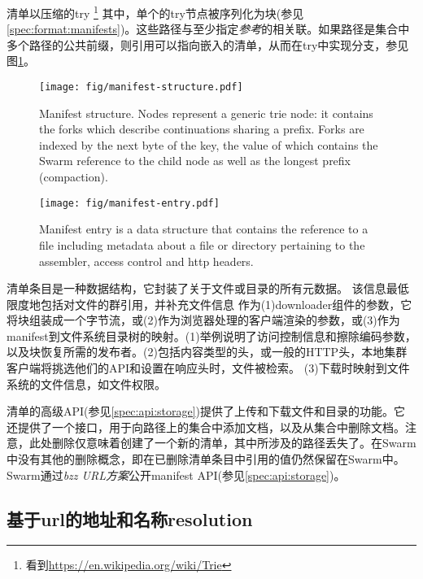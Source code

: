 清单以压缩的try %
%
\footnote{看到\url{https://en.wikipedia.org/wiki/Trie}}
%
其中，单个的try节点被序列化为块(参见\ref{spec:format:manifests})。这些路径与至少指定\emph{参考}的相关联。如果路径是集合中多个路径的公共前缀，则引用可以指向嵌入的清单，从而在try中实现分支，参见图\ref{fig:manifest-structure}。 


\begin{figure}[htbp]
\centering
\texttt{[image: fig/manifest-structure.pdf]}
\caption[Manifest structure \statusgreen]{Manifest structure. Nodes represent a generic trie node: it contains the forks which describe continuations sharing a prefix. Forks are indexed by the next byte of the key, the value of which contains the Swarm reference to the child node as well as the longest prefix (compaction).}
\label{fig:manifest-structure}
\end{figure}

\begin{figure}[htbp]
\centering
\texttt{[image: fig/manifest-entry.pdf]}
\caption[Manifest entry \statusgreen]{Manifest entry is a data  structure that contains the reference to a file including metadata about a file or directory  pertaining to the assembler, access control and http headers.}
\label{fig:manifest-entry}
\end{figure}

清单条目是一种数据结构，它封装了关于文件或目录的所有元数据。
该信息最低限度地包括对文件的群引用，并补充文件信息
作为(1)downloader组件的参数，它将块组装成一个字节流，或(2)作为浏览器处理的客户端渲染的参数，或(3)作为manifest到文件系统目录树的映射。(1)举例说明了访问控制信息和擦除编码参数，以及块恢复所需的发布者。(2)包括内容类型的头，或一般的HTTP头，本地集群客户端将挑选他们的API和设置在响应头时，文件被检索。 
(3)下载时映射到文件系统的文件信息，如文件权限。

清单的高级API(参见\ref{spec:api:storage})提供了上传和下载文件和目录的功能。它还提供了一个接口，用于向路径上的集合中添加文档，以及从集合中删除文档。注意，此处删除仅意味着创建了一个新的清单，其中所涉及的路径丢失了。在Swarm中没有其他的删除概念，即在已删除清单条目中引用的值仍然保留在Swarm中。Swarm通过\emph{bzz URL方案}公开manifest API(参见\ref{spec:api:storage})。

\subsection{基于url的地址和名称resolution\statusgreen}\label{sec:urls}

